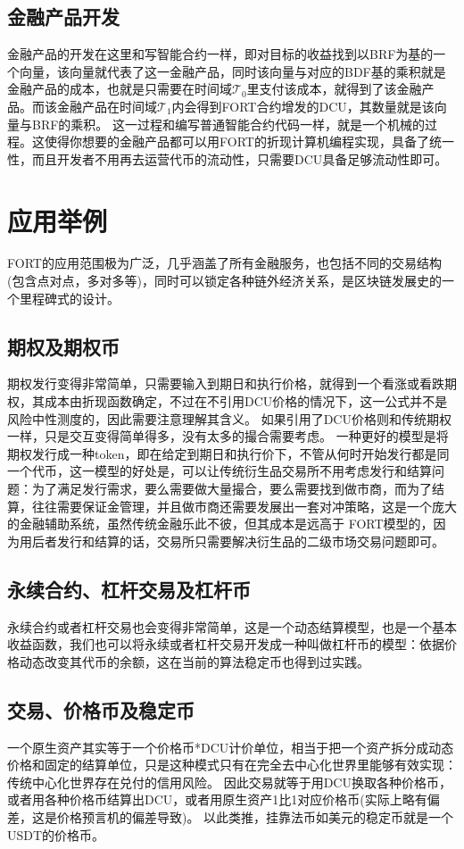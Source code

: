 \documentclass[letterpaper,11pt]{ctexart}
\begin{document}
\subsection{金融产品开发}

金融产品的开发在这里和写智能合约一样，即对目标的收益找到以BRF为基的一个向量，该向量就代表了这一金融产品，同时该向量与对应的BDF基的乘积就是金融产品的成本，也就是只需要在时间域$\mathcal{T}_0$里支付该成本，就得到了该金融产品。而该金融产品在时间域$\mathcal{T}_1$内会得到FORT合约增发的DCU，其数量就是该向量与BRF的乘积。
这一过程和编写普通智能合约代码一样，就是一个机械的过程。这使得你想要的金融产品都可以用FORT的折现计算机编程实现，具备了统一性，而且开发者不用再去运营代币的流动性，只需要DCU具备足够流动性即可。


\section{应用举例}
FORT的应用范围极为广泛，几乎涵盖了所有金融服务，也包括不同的交易结构(包含点对点，多对多等)，同时可以锁定各种链外经济关系，是区块链发展史的一个里程碑式的设计。

\subsection{期权及期权币}
期权发行变得非常简单，只需要输入到期日和执行价格，就得到一个看涨或看跌期权，其成本由折现函数确定，不过在不引用DCU价格的情况下，这一公式并不是风险中性测度的，因此需要注意理解其含义。
如果引用了DCU价格则和传统期权一样，只是交互变得简单得多，没有太多的撮合需要考虑。
一种更好的模型是将期权发行成一种token，即在给定到期日和执行价下，不管从何时开始发行都是同一个代币，这一模型的好处是，可以让传统衍生品交易所不用考虑发行和结算问题：为了满足发行需求，要么需要做大量撮合，要么需要找到做市商，而为了结算，往往需要保证金管理，并且做市商还需要发展出一套对冲策略，这是一个庞大的金融辅助系统，虽然传统金融乐此不彼，但其成本是远高于 FORT模型的，因为用后者发行和结算的话，交易所只需要解决衍生品的二级市场交易问题即可。

\subsection{永续合约、杠杆交易及杠杆币}
永续合约或者杠杆交易也会变得非常简单，这是一个动态结算模型，也是一个基本收益函数，我们也可以将永续或者杠杆交易开发成一种叫做杠杆币的模型：依据价格动态改变其代币的余额，这在当前的算法稳定币也得到过实践。

\subsection{交易、价格币及稳定币}
一个原生资产其实等于一个价格币*DCU计价单位，相当于把一个资产拆分成动态价格和固定的结算单位，只是这种模式只有在完全去中心化世界里能够有效实现：传统中心化世界存在兑付的信用风险。
因此交易就等于用DCU换取各种价格币，或者用各种价格币结算出DCU，或者用原生资产1比1对应价格币(实际上略有偏差，这是价格预言机的偏差导致)。
以此类推，挂靠法币如美元的稳定币就是一个USDT的价格币。
\end{document}
